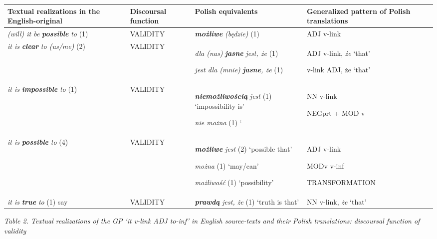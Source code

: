 \documentclass[12pt]{article}
\newenvironment{styleStandard}{\setlength\leftskip{0cm}\setlength\rightskip{0cm plus 1fil}\setlength\parindent{0cm}\setlength\parfillskip{0pt plus 1fil}\setlength\parskip{0in plus 1pt}\writerlistparindent\writerlistleftskip\leavevmode\normalfont\normalsize\writerlistlabel\ignorespaces}{\unskip\vspace{0.111in plus 0.0111in}\par}
\newcommand\writerlistleftskip{}
\newcommand\writerlistparindent{}
\newcommand\writerlistlabel{}
\begin{document}
\begin{flushleft}
\tablefirsthead{}
\tablehead{}
\tabletail{}
\tablelasttail{}
\begin{supertabular}{|m{1.0177599in}|m{0.7538598in}|m{1.4379599in}|m{1.2740599in}|}
\hline
\textbf{Textual realizations in the English-original} &
\textbf{Discoursal function } &
\textbf{Polish equivalents} &
\textbf{Generalized pattern of Polish translations }\\\hline
\textit{(will) it be }\textbf{\textit{possible}}\textit{ to} (1) &
VALIDITY &
\textbf{\textit{możliwe }}\textit{(będzie)} (1) &
ADJ v-link\\\hline
\textit{it is }\textbf{\textit{clear}}\textit{ to (us/me)} (2) &
VALIDITY &
\textit{dla (nas) }\textbf{\textit{jasne}}\textit{ jest, że} (1)

\textit{jest dla (mnie) }\textbf{\textit{jasne}}\textit{, że} (1) &
ADJ v-link,\textit{ że} ‘that’

v-link ADJ, że ‘that’\\\hline
\textit{it is }\textbf{\textit{impossible}}\textit{ to} (1) &
VALIDITY &
\textbf{\textit{niemożliwością}}\textit{ jest} (1) ‘impossibility is’

\textit{nie można} (1) ‘ &
NN v-link

NEGprt + MOD v \\\hline
\textit{it is }\textbf{\textit{possible}}\textit{ to} (4) &
VALIDITY &
\textbf{\textit{możliwe}}\textit{ jest} (2) ‘possible that’

\textit{można} (1) ‘may/can’

\textit{możliwość}\footnotemark{} (1) ‘possibility’ &
ADJ v-link

MODv v-inf

TRANSFORMATION\\\hline
\textit{it is }\textbf{\textit{true}}\textit{ to} (1) say  &
VALIDITY &
\textbf{\textit{prawdą}}\textit{ jest, że} (1) ‘truth is that’ &
NN v-link, \textit{że} ‘that’\\\hline
\end{supertabular}
\end{flushleft}
\begin{styleStandard}
\textit{Table 2. Textual realizations of the GP ‘it v-link ADJ to-inf’ in English source-texts and their Polish translations: discoursal function of validity}
\end{styleStandard}
\end{document}
